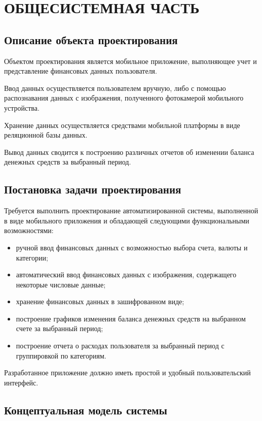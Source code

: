 \section[Общесистемная часть]{ОБЩЕСИСТЕМНАЯ ЧАСТЬ}

\subsection{Описание объекта проектирования}

Объектом проектирования является мобильное приложение,
выполняющее учет и представление финансовых данных пользователя.

Ввод данных осуществляется пользователем вручную,
либо с помощью распознавания данных с изображения,
полученного фотокамерой мобильного устройства.

Хранение данных осуществляется средствами мобильной платформы в
виде реляционной базы данных.

Вывод данных сводится к построению различных отчетов об изменении
баланса денежных средств за выбранный период.

\subsection{Постановка задачи проектирования}

Требуется выполнить проектирование автоматизированной системы,
выполненной в виде мобильного приложения и обладающей следующими
функциональными возможностями:
\begin{itemize}
\item ручной ввод финансовых данных с возможностью выбора счета,
  валюты и категории;
\item автоматический ввод финансовых данных с изображения,
  содержащего некоторые числовые данные;
\item хранение финансовых данных в зашифрованном виде;
\item построение графиков изменения баланса денежных средств
  на выбранном счете за выбранный период;
\item построение отчета о расходах пользователя
  за выбранный период с группировкой по категориям.
\end{itemize}

Разработанное приложение должно иметь простой и удобный
пользовательский интерфейс.

\pagebreak
\subsection{Концептуальная модель системы}


